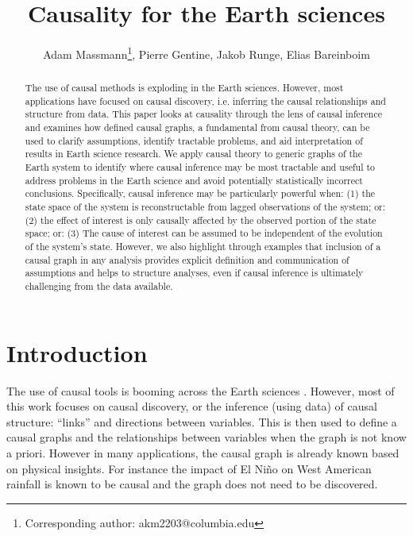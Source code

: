\documentclass[12pt]{article}
\begin{document}
\title{Causality for the Earth sciences}

\author{Adam Massmann\thanks{Corresponding author:
    akm2203@columbia.edu}, Pierre Gentine, Jakob Runge, Elias Bareinboim}

\maketitle
\begin{abstract}
  The use of causal methods is exploding in the Earth
  sciences. However, most applications have focused on causal
  discovery, i.e. inferring the causal relationships and structure
  from data. This paper looks at causality through the lens of causal
  inference and examines how defined causal graphs, a fundamental from
  causal theory, can be used to clarify assumptions, identify
  tractable problems, and aid interpretation of results in Earth
  science research. We apply causal theory to generic graphs of the
  Earth system to identify where causal inference may be most
  tractable and useful to address problems in the Earth science and
  avoid potentially statistically incorrect conclusions. Specifically,
  causal inference may be particularly powerful when: (1) the state
  space of the system is reconstructable from lagged observations of
  the system; or: (2) the effect of interest is only causally affected
  by the observed portion of the state space; or: (3) The cause of
  interest can be assumed to be independent of the evolution of the
  system’s state. However, we also highlight through examples that
  inclusion of a causal graph in any analysis provides explicit
  definition and communication of assumptions and helps to structure
  analyses, even if causal inference is ultimately challenging from
  the data available.
\end{abstract}

\section{Introduction}

The use of causal tools is booming across the Earth sciences
\citep[e.g.,][]{ebert-uphoff2012,
  samarasinghe-casuality,runge-causal-timeseries,runge2019inferring,goodwell-causality-2020}. However,
most of this work focuses on causal discovery, or the inference (using
data) of causal structure: ``links'' and directions between
variables. This is then used to define a causal graphs and the
relationships between variables when the graph is not know a
priori. However in many applications, the causal graph is already
known based on physical insights. For instance the impact of El Niño
on West American rainfall is known to be causal and the graph does not
need to be discovered.
\end{document}

